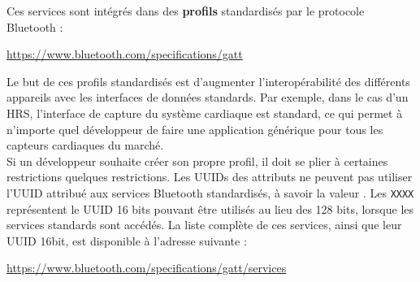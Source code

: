 Ces services sont intégrés dans des \textbf{profils} standardisés par le protocole Bluetooth : 
\begin{center}
    \url{https://www.bluetooth.com/specifications/gatt}
\end{center}

Le but de ces profils standardisés est d'augmenter l'interopérabilité des différents appareils avec les interfaces de données standards. Par exemple, dans le cas d'un HRS, l'interface de capture du système cardiaque est standard, ce qui permet à n'importe quel développeur de faire une application générique pour tous les capteurs cardiaques du marché. \\

Si un développeur souhaite créer son propre profil, il doit se plier à certaines restrictions quelques restrictions. Les UUIDs des attributs ne peuvent pas utiliser l'UUID attribué aux services Bluetooth standardisés, à savoir la valeur . Les \texttt{XXXX} représentent le UUID 16 bits pouvant être utilisés au lieu des 128 bits, lorsque les services standards sont accédés. La liste complète de ces services, ainsi que leur UUID 16bit, est disponible à l'adresse suivante : 
\begin{center}
    \url{https://www.bluetooth.com/specifications/gatt/services}
\end{center}



